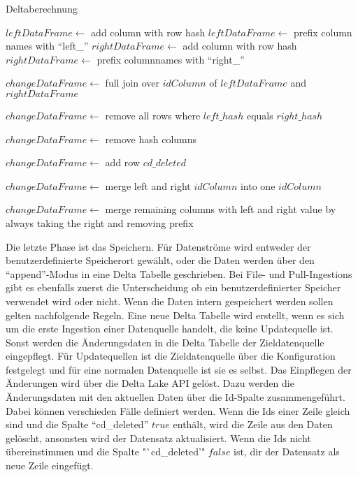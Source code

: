 \begin{algorithm}
\caption{Deltaberechnung}
\label{algo:delta-calc}
$leftDataFrame \gets$ add column with row hash \;
$leftDataFrame \gets$ prefix column names with "`left\_"' \;
$rightDataFrame \gets$ add column with row hash \;
$rightDataFrame \gets$ prefix columnnames with "`right\_"' \;

$changeDataFrame \gets$ full join over $idColumn$ of $leftDataFrame$ and $rightDataFrame$ \;

$changeDataFrame \gets$ remove all rows where $left\_hash$ equals $right\_hash$ \;

$changeDataFrame \gets$ remove hash columns

$changeDataFrame \gets$ add row $cd\_deleted$ \;

$changeDataFrame \gets$ merge left and right $idColumn$ into one $idColumn$

$changeDataFrame \gets$ merge remaining columns with left and right value by always taking the right and removing prefix

\end{algorithm}

Die letzte Phase ist das Speichern.
Für Datenströme wird entweder der benutzerdefinierte Speicherort gewählt, oder die Daten werden über den "`append"'-Modus in eine Delta Tabelle geschrieben.
Bei File- und Pull-Ingestions gibt es ebenfalls zuerst die Unterscheidung ob ein benutzerdefinierter Speicher verwendet wird oder nicht.
Wenn die Daten intern gespeichert werden sollen gelten nachfolgende Regeln.
Eine neue Delta Tabelle wird erstellt, wenn es sich um die erste Ingestion einer Datenquelle handelt, die keine Updatequelle ist.
Sonst werden die Änderungsdaten in die Delta Tabelle der Zieldatenquelle eingepflegt.
Für Updatequellen ist die Zieldatenquelle über die Konfiguration festgelegt und für eine normalen Datenquelle ist sie es selbst.
Das Einpflegen der Änderungen wird über die Delta Lake API gelöst.
Dazu werden die Änderungsdaten mit den aktuellen Daten über die Id-Spalte zusammengeführt.
Dabei können verschieden Fälle definiert werden.
Wenn die Ids einer Zeile gleich sind und die Spalte "`cd\_deleted"' $true$ enthält, wird die Zeile aus den Daten gelöscht, ansonsten wird der Datensatz aktualisiert.
Wenn die Ids nicht übereinstimmen und die Spalte "`cd\_deleted'" $false$ ist, dir der Datensatz als neue Zeile eingefügt.
